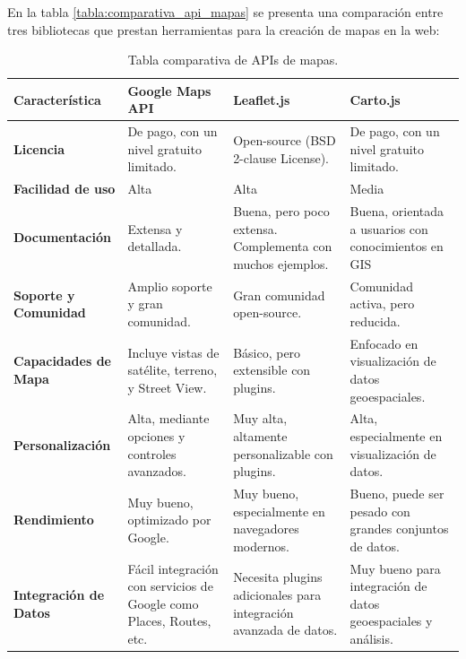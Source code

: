 En la tabla \ref{tabla:comparativa_api_mapas} se presenta una comparación entre tres bibliotecas que prestan herramientas para la creación de mapas en la web: 

\begin{table}[h]
    \centering
    \caption{Tabla comparativa de APIs de mapas.}
    \begin{tabular}{p{3cm} p{3cm} p{2.5cm} p{2.5cm} }
    \toprule
        \textbf{Característica}           & \textbf{Google Maps API}           & \textbf{Leaflet.js}               & \textbf{Carto.js} \\
        \midrule
        \textbf{Licencia}                & De pago, con un nivel gratuito limitado. & Open-source (BSD 2-clause License). & De pago, con un nivel gratuito limitado. \\
        
        \textbf{Facilidad de uso}        & Alta                               & Alta                              & Media \\
        
        \textbf{Documentación}           & Extensa y detallada.                & Buena, pero poco extensa. Complementa con muchos ejemplos. & Buena, orientada a usuarios con conocimientos en GIS \\
        
        \textbf{Soporte y Comunidad}     & Amplio soporte y gran comunidad.    & Gran comunidad open-source.         & Comunidad activa, pero reducida. \\
        
        \textbf{Capacidades de Mapa}     & Incluye vistas de satélite, terreno, y Street View. & Básico, pero extensible con plugins. & Enfocado en visualización de datos geoespaciales. \\
        
        \textbf{Personalización}           & Alta, mediante opciones y controles avanzados. & Muy alta, altamente personalizable con plugins. & Alta, especialmente en visualización de datos. \\
        
        \textbf{Rendimiento}             & Muy bueno, optimizado por Google.   & Muy bueno, especialmente en navegadores modernos. & Bueno, puede ser pesado con grandes conjuntos de datos. \\
        
        \textbf{Integración de Datos}    & Fácil integración con servicios de Google como Places, Routes, etc. & Necesita plugins adicionales para integración avanzada de datos. & Muy bueno para integración de datos geoespaciales y análisis. \\
        

\end{tabular}
\end{table}
